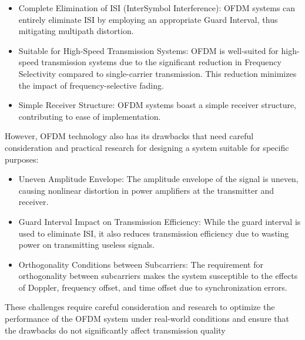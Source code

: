 \begin{itemize}
    \item  Complete Elimination of ISI (InterSymbol Interference): OFDM systems can entirely eliminate ISI by employing an appropriate Guard Interval, thus mitigating multipath distortion.
    \item Suitable for High-Speed Transmission Systems: OFDM is well-suited for high-speed transmission systems due to the significant reduction in Frequency Selectivity compared to single-carrier transmission. This reduction minimizes the impact of frequency-selective fading.
    \item Simple Receiver Structure: OFDM systems boast a simple receiver structure, contributing to ease of implementation.
\end{itemize}
However, OFDM technology also has its drawbacks that need careful consideration and practical research for designing a system suitable for specific purposes:
\begin{itemize}
    \item Uneven Amplitude Envelope: The amplitude envelope of the signal is uneven, causing nonlinear distortion in power amplifiers at the transmitter and receiver.
    \item Guard Interval Impact on Transmission Efficiency: While the guard interval is used to eliminate ISI, it also reduces transmission efficiency due to wasting power on transmitting useless signals.
    \item Orthogonality Conditions between Subcarriers: The requirement for orthogonality between subcarriers makes the system susceptible to the effects of Doppler, frequency offset, and time offset due to synchronization errors.
\end{itemize}
These challenges require careful consideration and research to optimize the performance of the OFDM system under real-world conditions and ensure that the drawbacks do not significantly affect transmission quality
